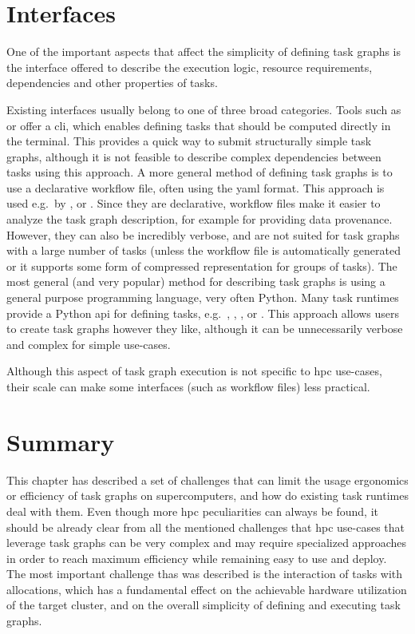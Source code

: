 \section{Interfaces}
One of the important aspects that affect the simplicity of defining task graphs is the interface
offered to describe the execution logic, resource requirements, dependencies and other
properties of tasks.

Existing interfaces usually belong to one of three broad categories. Tools such as \gnuparallel{} or \hypershell{}
offer a \gls{cli}, which enables defining tasks that should be computed directly in the
terminal. This provides a quick way to submit structurally simple task graphs, although it is
not feasible to describe complex dependencies between tasks using this approach. A more general
method of defining task graphs is to use a declarative workflow file, often using the \gls{yaml}
format. This approach is used e.g.\ by \pegasus{}, \autosubmit{} or \merlin{}. Since they
are declarative, workflow files make it easier to analyze the task graph description, for
example for providing data provenance. However, they can also be incredibly verbose, and are not
suited for task graphs with a large number of tasks (unless the workflow file is automatically
generated or it supports some form of compressed representation for groups of tasks). The most
general (and very popular) method for describing task graphs is using a general purpose
programming language, very often Python. Many task runtimes provide a Python \gls{api} for
defining tasks, e.g.\ \dask{}, \ray{}, \parsl{}, \balsam{} or \pegasus{}. This approach allows
users to create task graphs however they like, although it can be unnecessarily verbose and complex
for simple use-cases.

Although this aspect of task graph execution is not specific to \gls{hpc} use-cases,
their scale can make some interfaces (such as workflow files) less practical.

\section*{Summary}
This chapter has described a set of challenges that can limit the usage ergonomics or efficiency
of task graphs on supercomputers, and how do existing task runtimes deal with them.
Even though more \gls{hpc} peculiarities can always be found, it should be
already clear from all the mentioned challenges that \gls{hpc} use-cases that
leverage task graphs can be very complex and may require specialized approaches in order to reach
maximum efficiency while remaining easy to use and deploy. The most important challenge thas was
described is the interaction of tasks with allocations, which has a fundamental effect on the
achievable hardware utilization of the target cluster, and on the overall simplicity of defining
and executing task graphs.

